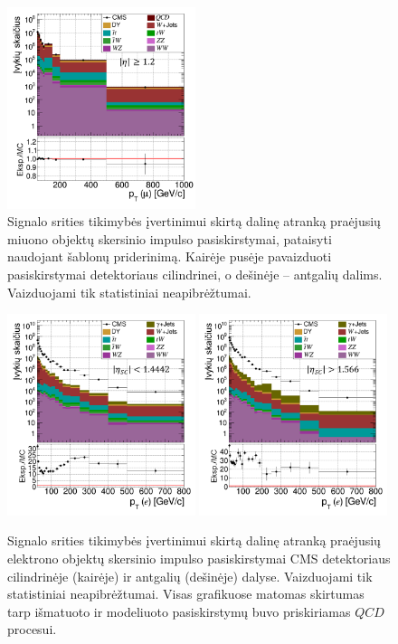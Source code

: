 \documentclass[a4paper, 12pt, oneside]{article}
\newcommand{\QCD}{QC\! D}
\begin{document}
\begin{figure}[t!]
	\includegraphics[width=0.49\textwidth]{Magistrinis/pT_mu_endcap_FIT.png}
	\caption{\label{fig:FRpT_muTFIT}
		Signalo srities tikimybės įvertinimui skirtą dalinę atranką praėjusių miuono objektų skersinio
		impulso pasiskirstymai, pataisyti naudojant šablonų priderinimą.
		Kairėje pusėje pavaizduoti pasiskirstymai detektoriaus cilindrinei, o dešinėje -- antgalių dalims.
		Vaizduojami tik statistiniai neapibrėžtumai.}
\end{figure}

\begin{figure}[t!]
	\includegraphics[width=0.49\textwidth]{Magistrinis/pT_e_barrel.png}
	\includegraphics[width=0.49\textwidth]{Magistrinis/pT_e_endcap.png}
	\vspace{-0.5cm}
	\caption{\label{fig:FRpT_e}
		Signalo srities tikimybės įvertinimui skirtą dalinę atranką praėjusių elektrono objektų skersinio
		impulso pasiskirstymai CMS detektoriaus cilindrinėje (kairėje) ir antgalių (dešinėje) dalyse.
		Vaizduojami tik statistiniai neapibrėžtumai.
		Visas grafikuose matomas skirtumas tarp išmatuoto ir modeliuoto pasiskirstymų buvo priskiriamas $\QCD$ procesui.}
\end{figure}
\end{document}
